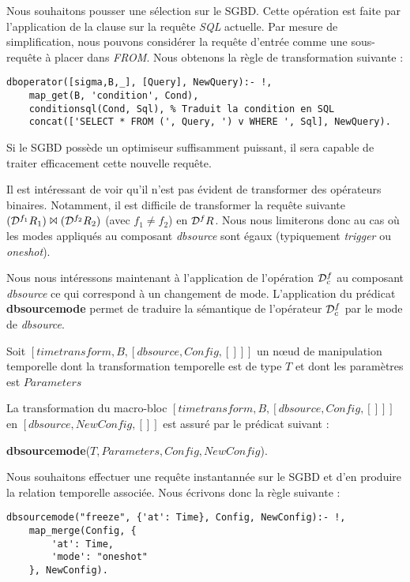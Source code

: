 \begin{example}
    Nous souhaitons pousser une sélection sur le SGBD. Cette opération est faite par l'application de la clause  sur la requête \textit{SQL} actuelle. Par mesure de simplification, nous pouvons considérer la requête d'entrée comme une sous-requête à placer dans \textit{FROM}. Nous obtenons la règle de transformation suivante :
    \begin{lstlisting}
dboperator([sigma,B,_], [Query], NewQuery):- !,
    map_get(B, 'condition', Cond),
    conditionsql(Cond, Sql), % Traduit la condition en SQL
    concat(['SELECT * FROM (', Query, ') v WHERE ', Sql], NewQuery).
    \end{lstlisting}

    Si le SGBD possède un optimiseur suffisamment puissant, il sera capable de traiter efficacement cette nouvelle requête.
\end{example}

Il est intéressant de voir qu'il n'est pas évident de transformer des opérateurs binaires. Notamment, il est difficile de transformer la requête suivante $(\mathcal{D}^{f_1} R_1)\Join (\mathcal{D}^{f_2} R_2)$ (avec $f_1\neq f_2$) en $\mathcal{D}^{f} R$. Nous nous limiterons donc au cas où les modes appliqués au composant \textit{dbsource} sont égaux (typiquement \textit{trigger} ou \textit{oneshot}).

Nous nous intéressons maintenant à l'application de l'opération $\mathcal{D}^f_c$ au composant \textit{dbsource} ce qui correspond à un changement de mode. L'application du prédicat \textbf{dbsourcemode} permet de traduire la sémantique de l'opérateur $\mathcal{D}^f_c$ par le mode de \textit{dbsource}.
\begin{regle}
    Soit $[timetransform,B,[dbsource, Config, []]]$ un nœud de manipulation temporelle dont la transformation temporelle est de type $T$ et dont les paramètres est $Parameters$

    La transformation du macro-bloc $[timetransform,B,[dbsource, Config, []]]$ en $[dbsource,NewConfig,[]]$ est assuré par le prédicat suivant :
    \begin{center} \textbf{dbsourcemode}($T, Parameters, Config, NewConfig$).\end{center}
\end{regle}
\begin{example}
    Nous souhaitons effectuer une requête instantannée sur le SGBD et d'en produire la relation temporelle associée. Nous écrivons donc la règle suivante :
    \begin{lstlisting}
dbsourcemode("freeze", {'at': Time}, Config, NewConfig):- !,
    map_merge(Config, {
        'at': Time,
        'mode': "oneshot"
    }, NewConfig).
    \end{lstlisting}
\end{example}


